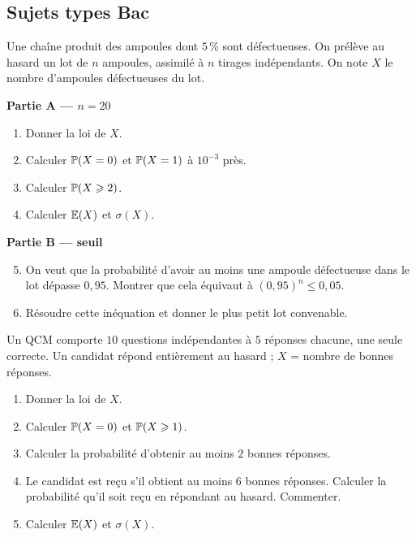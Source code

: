 \subsection{Sujets types Bac}

Une chaîne produit des ampoules dont $5\,\%$ sont défectueuses. On prélève au
hasard un lot de $n$ ampoules, assimilé à $n$ tirages indépendants. On note
$X$ le nombre d'ampoules défectueuses du lot.

\textbf{Partie A — $n = 20$}
\begin{enumerate}
	\item Donner la loi de $X$.
	\item Calculer $\mathbb{P}(X=0)$ et $\mathbb{P}(X=1)$ à $10^{-3}$ près.
	\item Calculer $\mathbb{P}(X\geqslant 2)$.
	\item Calculer $\mathbb{E}(X)$ et $\sigma(X)$.
\end{enumerate}

\textbf{Partie B — seuil}
\begin{enumerate}
	\setcounter{enumi}{4}
	\item On veut que la probabilité d'avoir au moins une ampoule défectueuse
	dans le lot dépasse $0{,}95$. Montrer que cela équivaut à
	$(0{,}95)^n\leqslant 0{,}05$.
	\item Résoudre cette inéquation et donner le plus petit lot convenable.
\end{enumerate}

Un QCM comporte $10$ questions indépendantes à $5$ réponses chacune, une
seule correcte. Un candidat répond entièrement au hasard ; $X$ = nombre de
bonnes réponses.
\begin{enumerate}
	\item Donner la loi de $X$.
	\item Calculer $\mathbb{P}(X=0)$ et $\mathbb{P}(X\geqslant 1)$.
	\item Calculer la probabilité d'obtenir au moins $2$ bonnes réponses.
	\item Le candidat est reçu s'il obtient au moins $6$ bonnes réponses.
	Calculer la probabilité qu'il soit reçu en répondant au hasard.
	Commenter.
	\item Calculer $\mathbb{E}(X)$ et $\sigma(X)$.
\end{enumerate}

